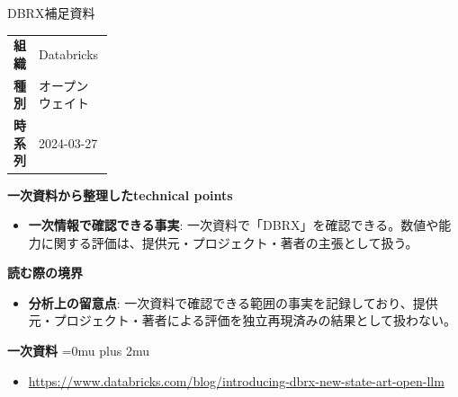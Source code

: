 \begin{technicalnote}{DBRX}{補足資料}
\begingroup
\begin{tabularx}{\linewidth}{@{}>{\bfseries}p{0.22\linewidth}X@{}}
組織 & Databricks \\
種別 & オープンウェイト \\
時系列 & 2024-03-27 \\
\end{tabularx}
\smallskip
{\bfseries 一次資料から整理したtechnical points}
\begin{itemize}[leftmargin=1.5em,itemsep=0.35em]
\item \textbf{一次情報で確認できる事実}: 一次資料で「DBRX」を確認できる。数値や能力に関する評価は、提供元・プロジェクト・著者の主張として扱う。
\end{itemize}
\begin{minipage}{\linewidth}
{\bfseries 読む際の境界}
\begin{itemize}[leftmargin=1.5em,itemsep=0.35em]
\item \textbf{分析上の留意点}: 一次資料で確認できる範囲の事実を記録しており、提供元・プロジェクト・著者による評価を独立再現済みの結果として扱わない。
\end{itemize}
\begin{samepage}
{\bfseries 一次資料}
\begingroup\sloppy
\Urlmuskip=0mu plus 2mu\relax
\begin{itemize}[leftmargin=1.5em,itemsep=0.25em]
\item {\scriptsize\url{https://www.databricks.com/blog/introducing-dbrx-new-state-art-open-llm}}
\end{itemize}
\endgroup
\end{samepage}
\end{minipage}
\endgroup
\end{technicalnote}
\medskip

